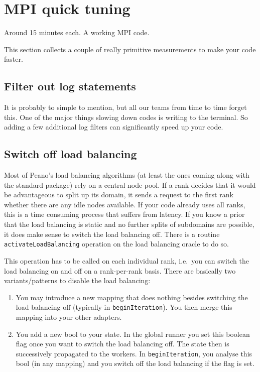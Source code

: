 \section{MPI quick tuning}


\chapterDescription
  {
    Around 15 minutes each.
  }
  {
    A working MPI code.
  }


This section collects a couple of really primitive measurements to make your
code faster.

\subsection{Filter out log statements}

It is probably to simple to mention, but all our teams from time to time forget
this. 
One of the major things slowing down codes is writing to the terminal. 
So adding a few additional log filters can significantly speed up your code.



\subsection{Switch off load balancing}

Most of Peano's load balancing algorithms (at least the ones coming along with
the standard package) rely on a central node pool.
If a rank decides that it would be advantageous to split up its domain, it sends
a request to the first rank whether there are any idle nodes available.
If your code already uses all ranks, this is a time consuming process that
suffers from latency.
If you know a prior that the load balancing is static and no further splits of
subdomains are possible, it does make sense to switch the load balancing off.
There is a routine \texttt{activateLoadBalancing} operation on the load
balancing oracle to do so.

This operation has to be called on each individual rank, i.e.~you can switch 
the load balancing on and off on a rank-per-rank basis. There are basically two
variants/patterns to disable the load balancing:
\begin{enumerate}
  \item You may introduce a new mapping that does nothing besides switching the
  load balancing off (typically in \texttt{beginIteration}). You then merge this
  mapping into your other adapters.
  \item You add a new bool to your state. In the global runner you set this
  boolean flag once you want to switch the load balancing off. The state then is
  successively propagated to the workers. In \texttt{beginIteration}, you
  analyse this bool (in any mapping) and you switch off the load balancing if
  the flag is set.
\end{enumerate}

